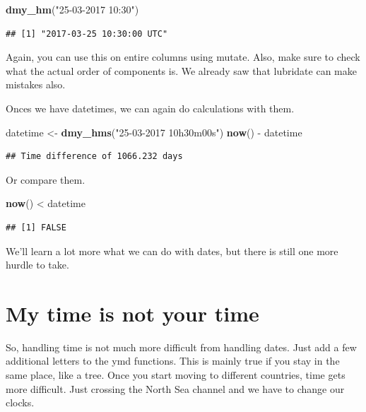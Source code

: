 \documentclass[]{tufte-book}
\newenvironment{Shaded}{}{}
\newcommand{\KeywordTok}[1]{\textcolor[rgb]{0.00,0.44,0.13}{\textbf{#1}}}
\newcommand{\NormalTok}[1]{#1}
\newcommand{\OperatorTok}[1]{\textcolor[rgb]{0.40,0.40,0.40}{#1}}
\newcommand{\StringTok}[1]{\textcolor[rgb]{0.25,0.44,0.63}{#1}}
\begin{document}
\begin{Shaded}
\begin{Highlighting}[]
\KeywordTok{dmy_hm}\NormalTok{(}\StringTok{"25-03-2017 10:30"}\NormalTok{)}
\end{Highlighting}
\end{Shaded}

\begin{verbatim}
## [1] "2017-03-25 10:30:00 UTC"
\end{verbatim}

Again, you can use this on entire columns using mutate. Also, make sure to check what the actual order of components is. We already saw that lubridate can make mistakes also.

Onces we have datetimes, we can again do calculations with them.

\begin{Shaded}
\begin{Highlighting}[]
\NormalTok{datetime <-}\StringTok{ }\KeywordTok{dmy_hms}\NormalTok{(}\StringTok{"25-03-2017 10h30m00s"}\NormalTok{)}
\KeywordTok{now}\NormalTok{() }\OperatorTok{-}\StringTok{ }\NormalTok{datetime}
\end{Highlighting}
\end{Shaded}

\begin{verbatim}
## Time difference of 1066.232 days
\end{verbatim}

Or compare them.

\begin{Shaded}
\begin{Highlighting}[]
\KeywordTok{now}\NormalTok{() }\OperatorTok{<}\StringTok{ }\NormalTok{datetime}
\end{Highlighting}
\end{Shaded}

\begin{verbatim}
## [1] FALSE
\end{verbatim}

We'll learn a lot more what we can do with dates, but there is still one more hurdle to take.

\hypertarget{my-time-is-not-your-time}{%
\section{My time is not your time}\label{my-time-is-not-your-time}}

So, handling time is not much more difficult from handling dates. Just add a few additional letters to the ymd functions. This is mainly true if you stay in the same place, like a tree. Once you start moving to different countries, time gets more difficult. Just crossing the North Sea channel and we have to change our clocks.
\end{document}
